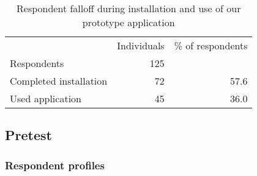 \begin{table}[h]
  \begin{tabular}{lrr}

    &
    \multicolumn{1}{c}{Individuals} &
    \multicolumn{1}{c}{\% of respondents} \\

    \cmidrule(lr){2-2}
    \cmidrule(lr){3-3}

    Respondents &
    125 &
    \\

    Completed installation &
    72 &
    57.6 \\

    Used application &
    45 &
    36.0 \\

  \end{tabular}
  \caption[Respondents Falloff]{%
    Respondent falloff during installation and use of our prototype
    application}
  \label{table:respondents.falloff}
\end{table}

\subsection{Pretest}

\subsubsection{Respondent profiles}

